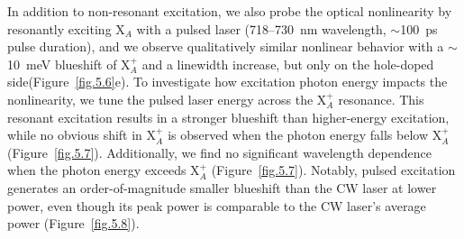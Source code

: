 In addition to non-resonant excitation, we also probe the optical nonlinearity by resonantly exciting X$_A$ with a pulsed laser (718--730~nm wavelength, $\sim$100~ps pulse duration), and we observe qualitatively similar nonlinear behavior with a $\sim$10~meV blueshift of X$_A^+$ and a linewidth increase, but only on the hole-doped side(Figure~\ref{fig.5.6}e). 
To investigate how excitation photon energy impacts the nonlinearity, we tune the pulsed laser energy across the X$_A^+$ resonance. 
This resonant excitation results in a stronger blueshift than higher-energy excitation, while no obvious shift in X$_A^+$ is observed when the photon energy falls below X$_A^+$ (Figure~\ref{fig.5.7}). 
Additionally, we find no significant wavelength dependence when the photon energy exceeds X$_A^+$ (Figure~\ref{fig.5.7}). 
Notably, pulsed excitation generates an order-of-magnitude smaller blueshift than the CW laser at lower power, even though its peak power is comparable to the CW laser’s average power (Figure~\ref{fig.5.8}).

